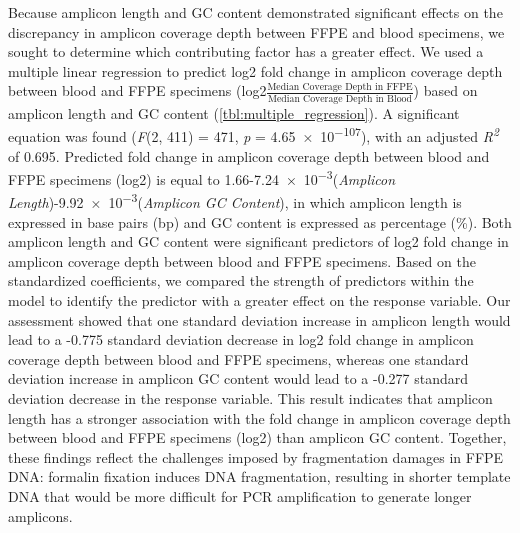 Because amplicon length and GC content demonstrated significant effects on the discrepancy in amplicon coverage depth between FFPE and blood specimens, we sought to determine which contributing factor has a greater effect. We used a multiple linear regression to predict log2 fold change in amplicon coverage depth between blood and FFPE specimens (log2\( \frac{\text{Median Coverage Depth in FFPE}}{\text{Median Coverage Depth in Blood}} \)) based on amplicon length and GC content (\autoref{tbl:multiple_regression}). A significant equation was found (\textit{F}(2, 411) = 471, \textit{p} = \num{4.65e-107}), with an adjusted \textit{R\textsuperscript{2}} of 0.695. Predicted fold change in amplicon coverage depth between blood and FFPE specimens (log2) is equal to 1.66-\num{7.24e-3}(\textit{Amplicon Length})-\num{9.92e-3}(\textit{Amplicon GC Content}), in which amplicon length is expressed in base pairs (bp) and GC content is expressed as percentage (\%). Both amplicon length and GC content were significant predictors of log2 fold change in amplicon coverage depth between blood and FFPE specimens. Based on the standardized coefficients, we compared the strength of predictors within the model to identify the predictor with a greater effect on the response variable. Our assessment showed that one standard deviation increase in amplicon length would lead to a -0.775 standard deviation decrease in log2 fold change in amplicon coverage depth between blood and FFPE specimens, whereas one standard deviation increase in amplicon GC content would lead to a -0.277 standard deviation decrease in the response variable. This result indicates that amplicon length has a stronger association with the fold change in amplicon coverage depth between blood and FFPE specimens (log2) than amplicon GC content. Together, these findings reflect the challenges imposed by fragmentation damages in FFPE DNA: formalin fixation induces DNA fragmentation, resulting in shorter template DNA that would be more difficult for PCR amplification to generate longer amplicons.



